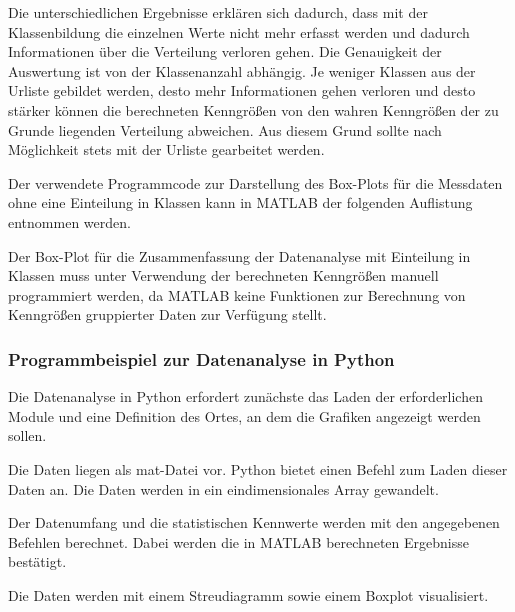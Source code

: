 \noindent Die unterschiedlichen Ergebnisse erkl\"{a}ren sich dadurch, dass mit der Klassenbildung die einzelnen Werte nicht mehr erfasst werden und dadurch Informationen \"{u}ber die Verteilung verloren gehen. Die Genauigkeit der Auswertung ist von der Klassenanzahl abh\"{a}ngig. Je weniger Klassen aus der Urliste gebildet werden, desto mehr Informationen gehen verloren und desto st\"{a}rker k\"{o}nnen die berechneten Kenngr\"{o}{\ss}en von den wahren Kenngr\"{o}{\ss}en der zu Grunde liegenden Verteilung abweichen. Aus diesem Grund sollte nach M\"{o}glichkeit stets mit der Urliste gearbeitet werden. \newline

\noindent Der verwendete Programmcode zur Darstellung des Box-Plots f\"{u}r die Messdaten ohne eine Einteilung in Klassen kann in MATLAB der folgenden Auflistung entnommen werden.



\noindent Der Box-Plot f\"{u}r die Zusammenfassung der Datenanalyse mit Einteilung in Klassen muss unter Verwendung der berechneten Kenngr\"{o}{\ss}en manuell programmiert werden, da MATLAB keine Funktionen zur Berechnung von Kenngr\"{o}{\ss}en gruppierter Daten zur Verf\"{u}gung stellt.

\subsubsection{Programmbeispiel zur Datenanalyse in Python}

\noindent Die Datenanalyse in Python erfordert zun\"{a}chste das Laden der erforderlichen Module und eine Definition des Ortes, an dem die Grafiken angezeigt werden sollen.



\noindent Die Daten liegen als mat-Datei vor. Python bietet einen Befehl zum Laden dieser Daten an. Die Daten werden in ein eindimensionales Array gewandelt.



\noindent Der Datenumfang und die statistischen Kennwerte werden mit den angegebenen Befehlen berechnet. Dabei werden die in MATLAB berechneten Ergebnisse best\"{a}tigt.



\noindent Die Daten werden mit einem Streudiagramm sowie einem Boxplot visualisiert.

